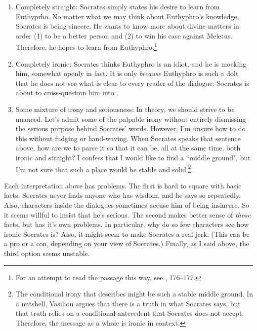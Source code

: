 \documentclass[11pt]{article}
\begin{document}
\begin{enumerate}

    \item Completely straight: Socrates simply states his desire to learn
        from Euthyprho.  No matter what we may think about Euthyphro's
        knowledge, Socrates is being sincere.  He wants to know more about
        divine matters in order (1) to be a better person and (2) to win
        his case against Meletus.  Therefore, he hopes to learn from
        Euthyphro.\footnote{For an attempt to read the passage this way,
        see \citet{wolfsdorf2007}, 176--177.}

    \item Completely ironic: Socrates thinks Euthyphro is an idiot, and he
        is mocking him, somewhat openly in fact.  It is only \emph{because}
        Euthyphro is such a dolt that he does not see what is clear to
        every reader of the dialogue: Socrates is about to cross-question
        him into .

    \item Some mixture of irony and seriousness: In theory, we should
        strive to be nuanced. Let's admit some of the palpable irony
        without entirely dismissing the serious purpose behind Socrates'
        words.  However, I'm unsure how to do this without fudging or
        hand-waving.  When Socrates speaks that sentence above, how are we
        to parse it so that it can be, all at the same time, both ironic
        and straight?  I confess that I would like to find a ``middle
        ground", but I'm not sure that such a place would be stable and
        solid.\footnote{The conditional irony that \citet{vasiliou1998}
        describes might be such a stable middle ground.  In a nutshell,
        Vasiliou argues that there is a truth in what Socrates says, but
        that truth relies on a conditional antecedent that Socrates does
        not accept.  Therefore, the message as a whole is ironic in
        context.}

\end{enumerate}

Each interpretation above has problems.  The first is hard to square with
basic facts.  Socrates never finds anyone who has wisdom, and he says so
repeatedly.  Also, characters inside the dialogues sometimes accuse him of
being insincere.  So it seems willful to insist that he's serious.  The
second makes better sense of \emph{those} facts, but has it's own problems.
In particular, why do so few characters see how ironic Socrates is?  Also,
it might seem to make Socrates a real jerk.  (This can be a pro or a con,
depending on your view of Socrates.)  Finally, as I said above, the third
option seems unstable.
\end{document}
